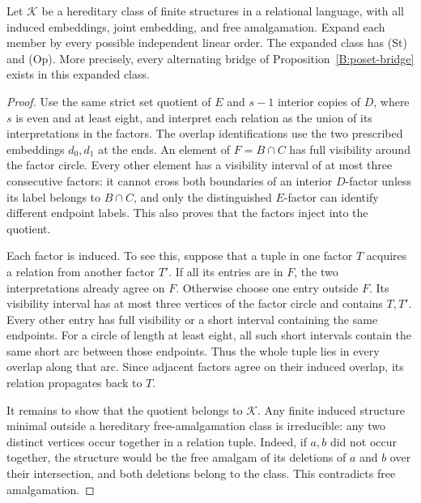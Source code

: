 \begin{proposition}
\label{B:relational-bridge}
Let $\mathcal K$ be a hereditary class of finite structures in a relational
language, with all induced embeddings, joint embedding, and free
amalgamation. Expand each member by every possible independent linear
order. The expanded class has (St) and (Op). More precisely, every
alternating bridge of Proposition~\ref{B:poset-bridge} exists in this
expanded class.
\end{proposition}
\begin{proof}
Use the same strict set quotient of $E$ and $s-1$ interior copies of $D$,
where $s$ is even and at least eight, and interpret each relation as the
union of its interpretations in the factors. The overlap identifications
use the two prescribed embeddings $d_0,d_1$ at the ends. An element of
$F=B\cap C$ has full visibility around the factor circle. Every other
element has a visibility interval of at most three consecutive factors:
it cannot cross both boundaries of an interior $D$-factor unless its
label belongs to $B\cap C$, and only the distinguished $E$-factor can
identify different endpoint labels. This also proves that the factors
inject into the quotient.

Each factor is induced. To see this, suppose that a tuple in one factor
$T$ acquires a relation from another factor $T'$. If all its entries are
in $F$, the two interpretations already agree on $F$. Otherwise choose
one entry outside $F$. Its visibility interval has at most three
vertices of the factor circle and contains $T,T'$. Every other entry
has full visibility or a short interval containing the same endpoints.
For a circle of length at least eight, all such short intervals contain
the same short arc between those endpoints. Thus the whole tuple lies
in every overlap along that arc. Since adjacent factors agree on their
induced overlap, its relation propagates back to $T$.

It remains to show that the quotient belongs to $\mathcal K$. Any
finite induced structure minimal outside a hereditary free-amalgamation
class is irreducible: any two distinct vertices occur together in a
relation tuple. Indeed, if $a,b$ did not occur together, the structure
would be the free amalgam of its deletions of $a$ and $b$ over their
intersection, and both deletions belong to the class. This contradicts
free amalgamation.


\end{proof}
